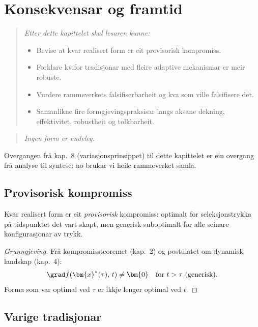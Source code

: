 \chapter{Konsekvensar og framtid}
\label{chap:konsekvensar}

\begin{quote}\itshape
Etter dette kapittelet skal lesaren kunne:
\begin{itemize}[nosep]
\item Bevise at kvar realisert form er eit provisorisk kompromiss.
\item Forklare kvifor tradisjonar med fleire adaptive mekanismar er meir robuste.
\item Vurdere rammeverkets falsifiserbarheit og kva som ville falsifisere det.
\item Samanlikne fire formgjevingspraksisar langs aksane dekning, effektivitet, robustheit og tolkbarheit.
\end{itemize}
\end{quote}

\begin{quote}
\itshape
Ingen form er endeleg.
\end{quote}

Overgangen frå kap.~8 (variasjonsprinsippet) til dette kapittelet
er ein overgang frå analyse til syntese: no brukar vi heile
rammeverket samla.


\section{Provisorisk kompromiss}

\begin{satmark}\label{thm:L.9.1}
Kvar realisert form er eit \emph{provisorisk} kompromiss:
optimalt for seleksjonstrykka på tidspunktet det vart skapt,
men generisk suboptimalt for alle seinare konfigurasjonar av trykk.
\end{satmark}

\begin{proof}[Grunngjeving]
Frå kompromissteoremet (kap.~2) og postulatet om dynamisk
landskap (kap.~4):
\[
  \grad f(\bm{x}^*(\tau),\, t) \neq \bm{0}
  \quad \text{for } t > \tau \text{ (generisk)}.
\]
Forma som var optimal ved $\tau$ er ikkje lenger optimal ved $t$.
\end{proof}


\section{Varige tradisjonar}

